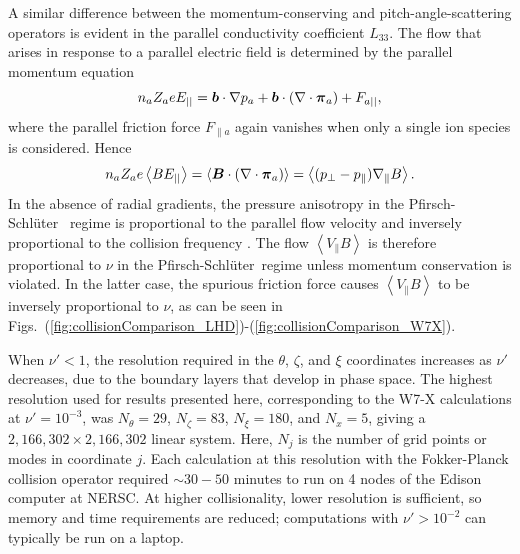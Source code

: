 \documentclass[12pt]{revtex4}
\newcommand{\vect}[1]{\mbox{\boldmath $#1$}}
\newcommand{\PS}{Pfirsch-Schl\"{u}ter~}
\begin{document}
A similar difference between the momentum-conserving and
pitch-angle-scattering operators is evident in the parallel
conductivity coefficient $L_{33}$. The flow that arises in response to
a parallel electric field is determined by the parallel momentum equation
\begin{equation} 
n_a Z_a e E_{||} = \vect{b}\cdot \nabla p_a + \vect{b}\cdot(\nabla \cdot \vect{\pi}_a )+ F_{a||}, 
\end{equation} 
where the parallel friction force $F_{\|a}$ again vanishes when only a
single ion species is considered. Hence 
\begin{equation} 
n_a Z_a e \left< B  E_{||} \right> = \left< \vect{B}\cdot(\nabla \cdot \vect{\pi}_a) \right> 
= \left< (p_\perp - p_\| ) \nabla_\| B \right>.
\end{equation}
In
the absence of radial gradients, the pressure anisotropy in the \PS
regime is proportional to the parallel flow velocity and inversely
proportional to the collision frequency \cite{AndreiPer2009}. The
flow $\left< V_\| B \right>$ is therefore proportional to $\nu$ in
the \PS regime unless momentum conservation is violated. In the
latter case, the spurious friction force causes $\left< V_\| B
\right>$ to be inversely proportional to $\nu$, as can be seen in
Figs.~(\ref{fig:collisionComparison_LHD})-(\ref{fig:collisionComparison_W7X}).


When $\nu' < 1$, the resolution required in the $\theta$, $\zeta$, and $\xi$ coordinates
increases as $\nu'$ decreases,
due to the boundary layers that develop in phase space.  The highest resolution used
for results presented here, corresponding to the W7-X calculations at  $\nu'=10^{-3}$,
was $N_\theta=29$, $N_\zeta = 83$, $N_\xi=180$, and $N_x=5$,
giving a $2,166,302 \times 2,166,302$ linear system.
Here, $N_j$ is the number of grid points or modes in coordinate $j$.
Each calculation at this resolution with the Fokker-Planck collision operator
required $\sim 30-50$ minutes to run on 4 nodes of the Edison computer at NERSC.
At higher collisionality, lower resolution is sufficient, so memory and time requirements are reduced;
computations with $\nu' > 10^{-2}$ can typically be run on a laptop.
\end{document}
